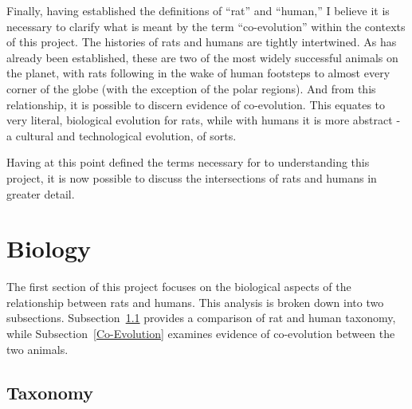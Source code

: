 \documentclass[12pt]{article}
\begin{document}
Finally, having established the definitions of ``rat'' and ``human,'' I believe it is necessary to clarify what is meant by the term ``co-evolution'' within the contexts of this project. The histories of rats and humans are tightly intertwined. As has already been established, these are two of the most widely successful animals on the planet, with rats following in the wake of human footsteps to almost every corner of the globe (with the exception of the polar regions). And from this relationship, it is possible to discern evidence of co-evolution. This equates to very literal, biological evolution for rats, while with humans it is more abstract - a cultural and technological evolution, of sorts.

Having at this point defined the terms necessary for to understanding this project, it is now possible to discuss the intersections of rats and humans in greater detail.

\section{Biology} \label{Biology}

The first section of this project focuses on the biological aspects of the relationship between rats and humans. This analysis is broken down into two subsections. Subsection~\ref{Taxonomy} provides a comparison of rat and human taxonomy, while Subsection~\ref{Co-Evolution} examines evidence of co-evolution between the two animals.

\subsection{Taxonomy} \label{Taxonomy}
\end{document}
